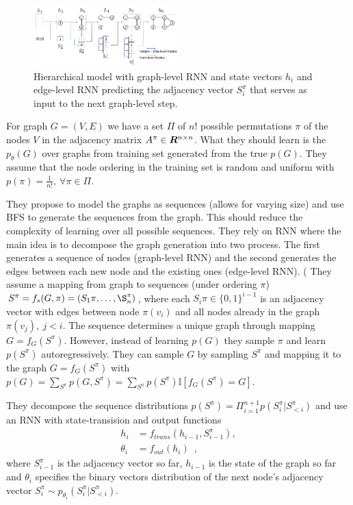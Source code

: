 \begin{figure}
\centering
\includegraphics[width=0.5\textwidth]{graphrnn_Figure1.png}
\caption{Hierarchical model with graph-level RNN and state vectors $h_i$ and edge-level RNN predicting the adjacency vector $S_i^\pi$ that serves as input to the next graph-level step.}
\end{figure}
For graph $G=(V, E)$ we have a set $\Pi$ of $n!$ possible permutations $\pi$ of the nodes $V$ in the adjacency matrix $A^\pi \in {\bm{R}}^{n \times n}$.
What they should learn is the $p_\theta(G)$ over graphs from training set generated from the true $p(G)$. 
They assume that the node ordering in the training set is random and uniform with $p(\pi) = \frac{1}{n!}, \ \forall \pi \in \Pi$.

They propose to model the graphs as sequences (allows for varying size) and use BFS to generate the sequences from the graph.
This should reduce the complexity of learning over all possible sequences. 
They rely on RNN where the main idea is to decompose the graph generation into two process.
The first generates a sequence of nodes (graph-level RNN) and the second generates the edges between each new node and the existing ones (edge-level RNN). 
(
They assume a mapping from graph to sequences (under ordering $\pi$) $S^\pi = f_s(G, \pi) = (S_1\pi, \ldots, \S_n^\pi)$, where each $S_i\pi \in \{0, 1\}^{i-1}$ is an adjacency vector with edges between node $\pi(v_i)$ and all nodes already in the graph $\pi(v_j), \ j<i$.
The sequence determines a unique graph through mapping $G = f_G(S^\pi)$.
However, instead of learning $p(G)$ they sample $\pi$  and learn $p(S^\pi)$ autoregressively.
They can sample $G$ by sampling $S^\pi$ and mapping it to the graph $G = f_G(S^\pi)$ with
$p(G) = \sum_{S^\pi} p(G, S^\pi) = \sum_{S^\pi} p(S^\pi) \mathbb{I}[f_G(S^\pi) = G]$.

They decompose the sequence distributions $p(S^\pi) = \Pi_{i=1}^{n+1} p(S^\pi_i |  S^\pi_{<i})$ and use an RNN with state-transision and output functions
\begin{align*}
h_i & = f_{trans}(h_{i-1}, S^\pi_{i-1}), \\
\theta_i & = f_{out}(h_i) \enspace, 
\end{align*}
where $S^\pi_{i-1}$ is the adjacency vector so far, $h_{i-1}$ is the state of the graph so far and $\theta_i$ specifies the binary vectors distribution of the next node's adjacency vector $S^\pi_{i} \sim p_{\theta_i}(S^\pi_i |  S^\pi_{<i})$.

